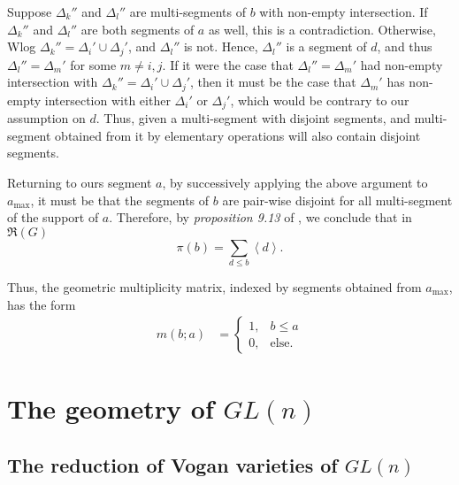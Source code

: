 \documentclass{memoir}
\newcommand{\mf}{\mathfrak}
\newcommand{\la}{\left\langle}
\newcommand{\ra}{\right\rangle}
\newcommand{\tx}{\text}
\theoremstyle{definition}
\begin{document}
 	Suppose $\Delta_k''$ and $\Delta_l''$ are multi-segments of $b$ with non-empty intersection.  
 	If $\Delta_k''$ and $\Delta_l''$ are both segments of $a$ as well, this is a contradiction.  
 	Otherwise, Wlog $\Delta_k''=\Delta_i'\cup\Delta_j'$, and $\Delta_l''$ is not.  
 	Hence, $\Delta_l''$ is a segment of $d$, and thus $\Delta_l''=\Delta_m'$ for some $m\neq i, j$.  
 	If it were the case that $\Delta_l''=\Delta_m'$ had non-empty intersection with $\Delta_k''=\Delta_i'\cup\Delta_j'$, then it must be the case that $\Delta_m'$ has non-empty intersection with either $\Delta_i'$ or $\Delta_j'$, which would be contrary to our assumption on $d$.  
 	Thus, given a multi-segment with disjoint segments, and multi-segment obtained from it by elementary operations will also contain disjoint segments.  
 	
 	Returning to ours segment $a$, by successively applying the above argument to $a_{\tx{max}}$, it must be that the segments of $b$ are pair-wise disjoint for all multi-segment of the support of $a$.    
 	Therefore, by \emph{proposition 9.13} of \cite{ZelI2}, we conclude that in $\mf{R}(G)$
 	$$\pi(b)=\sum_{d\leq b}\la d\ra.$$
 	
 	Thus, the geometric multiplicity matrix, indexed by segments obtained from $a_{\tx{max}}$, has the form 
 	\begin{align}
 		m(b;a)&=\begin{cases}
 		1, & b\leq a\\
 		0, & \tx{else.}
 	\end{cases}\label{m-free-spec}
 \end{align}
 
 
 
 
 
 
 
 
 
 
 
 
 
 
 
 
 
 
 
 
 
 
 
 
 
 
 
 	\chapter{The geometry of $GL(n)$}


		\section{The reduction of Vogan varieties of $GL(n)$}
	
\end{document}
